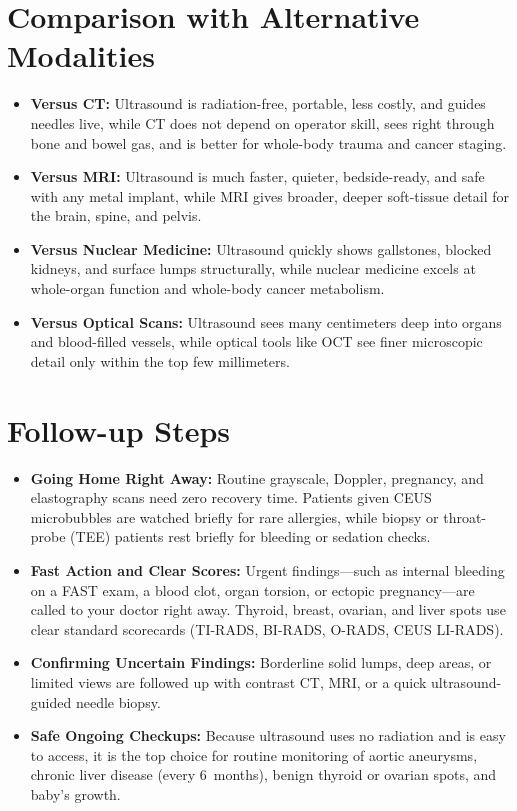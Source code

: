 \section{Comparison with Alternative Modalities}
\begin{itemize}
  \item \textbf{Versus CT:} Ultrasound is radiation-free, portable, less costly, and guides needles live, while CT does not depend on operator skill, sees right through bone and bowel gas, and is better for whole-body trauma and cancer staging.
  \item \textbf{Versus MRI:} Ultrasound is much faster, quieter, bedside-ready, and safe with any metal implant, while MRI gives broader, deeper soft-tissue detail for the brain, spine, and pelvis.
  \item \textbf{Versus Nuclear Medicine:} Ultrasound quickly shows gallstones, blocked kidneys, and surface lumps structurally, while nuclear medicine excels at whole-organ function and whole-body cancer metabolism.
  \item \textbf{Versus Optical Scans:} Ultrasound sees many centimeters deep into organs and blood-filled vessels, while optical tools like OCT see finer microscopic detail only within the top few millimeters.
\end{itemize}

\section{Follow-up Steps}
\begin{itemize}
  \item \textbf{Going Home Right Away:} Routine grayscale, Doppler, pregnancy, and elastography scans need zero recovery time. Patients given CEUS microbubbles are watched briefly for rare allergies, while biopsy or throat-probe (TEE) patients rest briefly for bleeding or sedation checks.
  \item \textbf{Fast Action and Clear Scores:} Urgent findings---such as internal bleeding on a FAST exam, a blood clot, organ torsion, or ectopic pregnancy---are called to your doctor right away. Thyroid, breast, ovarian, and liver spots use clear standard scorecards (TI-RADS, BI-RADS, O-RADS, CEUS LI-RADS).
  \item \textbf{Confirming Uncertain Findings:} Borderline solid lumps, deep areas, or limited views are followed up with contrast CT, MRI, or a quick ultrasound-guided needle biopsy.
  \item \textbf{Safe Ongoing Checkups:} Because ultrasound uses no radiation and is easy to access, it is the top choice for routine monitoring of aortic aneurysms, chronic liver disease (every 6~months), benign thyroid or ovarian spots, and baby's growth.
\end{itemize}

